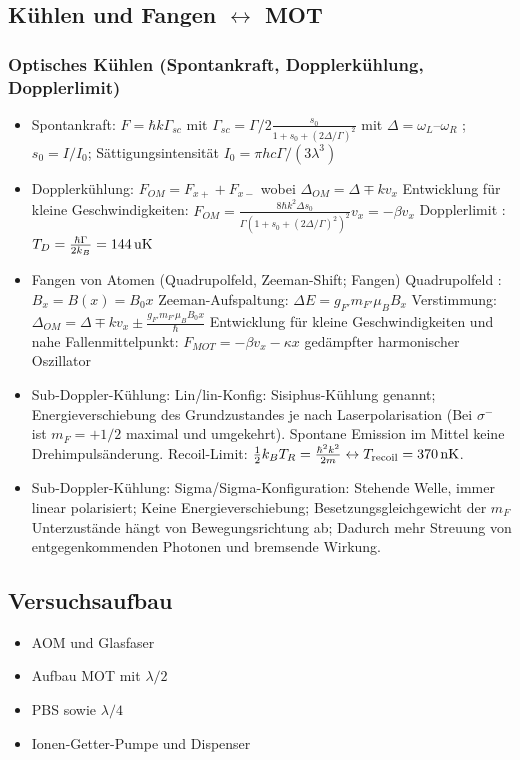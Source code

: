 \documentclass[10pt,a4paper]{extarticle}
\begin{document}
\subsection*{Kühlen und Fangen $\leftrightarrow$ MOT}
\subsubsection*{Optisches Kühlen (Spontankraft, Dopplerkühlung, Dopplerlimit)}
\begin{itemize}
\item Spontankraft: $F = \hbar k \Gamma_{sc}$ mit $\Gamma_{sc} =  \Gamma/2 \frac{s_0}{1+s_0+(2\Delta/\Gamma)^2}$ mit $\Delta = \omega_L – \omega_R$ ; $s_0= I/I_0$; Sättigungsintensität $I_0=\pi h c \Gamma/(3\lambda^3)$
\item Dopplerkühlung: $F_{OM} = F_{x+} + F_{x-}$ wobei $\Delta_{OM} = \Delta \mp k v_x$
Entwicklung für kleine Geschwindigkeiten: $F_{OM} = \frac{8 \hbar k^2 \Delta s_0}{\Gamma (1+s_0 + (2 \Delta/\Gamma)^2)^2} v_x = -\beta v_x $
Dopplerlimit : $T_D = \frac{\hbar \Gamma}{2 k_B} = \unit[144]{uK}$
\item Fangen von Atomen (Quadrupolfeld, Zeeman-Shift; Fangen)
Quadrupolfeld :  $B_x = B(x) = B_0 x$
Zeeman-Aufspaltung: $\Delta E = g_{F'} m_{F'} \mu_B B_x$
Verstimmung: $\Delta_{OM} = \Delta \mp k v_x \pm \frac{g_{F'} m_{F'} \mu_B B_0 x}{\hbar}$
Entwicklung für kleine Geschwindigkeiten und nahe Fallenmittelpunkt: $F_{MOT} = - \beta v_x - \kappa x$ gedämpfter harmonischer Oszillator
\item Sub-Doppler-Kühlung: Lin/lin-Konfig: Sisiphus-Kühlung genannt; Energieverschiebung des Grundzustandes je nach Laserpolarisation (Bei $\sigma^-$ ist $m_F=+1/2$ maximal und umgekehrt). Spontane Emission im Mittel keine Drehimpulsänderung. Recoil-Limit: $\frac{1}{2} k_B T_R = \frac{\hbar^2 k^2}{2m} \leftrightarrow T_{\mathrm{recoil}} = \unit[370]{nK}$.
\item Sub-Doppler-Kühlung: Sigma/Sigma-Konfiguration: Stehende Welle, immer linear polarisiert; Keine Energieverschiebung; Besetzungsgleichgewicht der $m_F$ Unterzustände hängt von Bewegungsrichtung ab; Dadurch mehr Streuung von entgegenkommenden Photonen und bremsende Wirkung.
\end{itemize}

\subsection*{Versuchsaufbau}
\begin{itemize}
\item AOM und Glasfaser
\item Aufbau MOT mit $\lambda/2$
\item PBS sowie $\lambda/4$
\item Ionen-Getter-Pumpe und Dispenser
\end{itemize}
\end{document}
